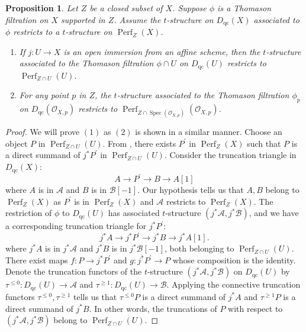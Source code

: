 \documentclass[10pt,a4paper]{amsart}
\newtheorem{proposition}{Proposition}
\begin{document}
\begin{proposition}\label{prop:reduction_to_affines_stalks}
   Let $Z$ be a closed subset of $X$. Suppose $\phi$ is a Thomason filtration on $X$ supported in $Z$. Assume the $t$-structure on $D_{\operatorname{qc}}(X)$ associated to $\phi$ restricts to a $t$-structure on $\operatorname{Perf}_Z (X)$. 
   \begin{enumerate}
       \item If $j \colon U \to X$ is an open immersion from an affine scheme, then the $t$-structure associated to the Thomason filtration $\phi\cap U$ on $D_{\operatorname{qc}}(U)$ restricts to $\operatorname{Perf}_{Z\cap U} (U)$.
       \item For any point $p$ in $Z$, the $t$-structure associated to the Thomason filtration $\phi_p$ on $D_{\operatorname{qc}}(\mathcal{O}_{X,p})$ restricts to $\operatorname{Perf}_{Z\cap \operatorname{Spec}(\mathcal{O}_{X,p})}(\mathcal{O}_{X,p})$.
   \end{enumerate}
\end{proposition}

\begin{proof}
   We will prove $(1)$ as $(2)$ is shown in a similar manner. Choose an object $P$ in $\operatorname{Perf}_{Z\cap U} (U)$. From , there exists $P^\prime$ in $\operatorname{Perf}_Z (X)$ such that $P$ is a direct summand of $j^\ast P^\prime$ in $\operatorname{Perf}_{Z\cap U}( U)$. Consider the truncation triangle in $D_{\operatorname{qc}}(X)$:
   \begin{displaymath}
       A \to P^\prime \to B \to A[1]
   \end{displaymath}
   where $A$ is in $\mathcal{A}$ and $B$ is in $\mathcal{B}[-1]$. Our hypothesis tells us that $A,B$ belong to $\operatorname{Perf}_Z (X)$ as $P^\prime$ is in $\operatorname{Perf}_Z (X)$ and $\mathcal{A}$ restricts to $\operatorname{Perf}_Z(X)$. The restriction of $\phi$ to $D_{\operatorname{qc}}(U)$ has associated $t$-structure $(j^\ast \mathcal{A},j^\ast \mathcal{B})$, and we have a corresponding truncation triangle for $j^\ast P^\prime$:
   \begin{displaymath}
       j^\ast A \to j^\ast P^\prime \to j^\ast B \to j^\ast A[1].
   \end{displaymath}
   where $j^\ast A$ is in $j^\ast \mathcal{A}$ and $j^\ast B$ is in $j^\ast \mathcal{B}[-1]$, both belonging to $\operatorname{Perf}_{Z\cap U} (U)$. There exist maps $f\colon P \to j^\ast P^\prime$ and $g\colon j^\ast P^\prime \to P$ whose composition is the identity. Denote the truncation functors of the $t$-structure $(j^\ast \mathcal{A},j^\ast \mathcal{B})$ on $D_{\operatorname{qc}}(U)$ by $\tau^{\leq 0} \colon D_{\operatorname{qc}}(U) \to \mathcal{A}$ and $\tau^{\geq 1} \colon D_{\operatorname{qc}}(U) \to \mathcal{B}$. Applying the connective truncation functors $\tau^{\leq 0}, \tau^{\geq 1}$ tells us that $\tau^{\leq 0} P$ is a direct summand of $j^\ast A$ and $\tau^{\geq 1} P$ is a direct summand of $j^\ast B$. In other words, the truncations of $P$ with respect to $(j^\ast \mathcal{A}, j^\ast \mathcal{B})$ belong to $\operatorname{Perf}_{Z\cap U} (U)$.
\end{proof}
\end{document}
